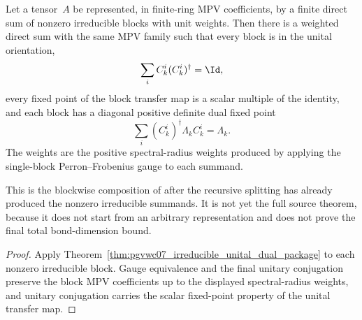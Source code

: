 \begin{theorem}%
    \label{thm:pgvwc07_blockwise_unital_dual_package}
    \leanok
    Let a tensor~$A$ be represented, in finite-ring MPV coefficients, by a
    finite direct sum of nonzero irreducible blocks with unit weights. Then
    there is a weighted direct sum with the same MPV family such that every
    block is in the unital orientation,
    \[
        \sum_i C_k^i(C_k^i)^\dagger=\Id ,
    \]
    every fixed point of the block transfer map is a scalar multiple of the
    identity, and each block has a diagonal positive definite dual fixed point
    \[
        \sum_i (C_k^i)^\dagger\Lambda_k C_k^i=\Lambda_k.
    \]
    The weights are the positive spectral-radius weights produced by applying
    the single-block Perron--Frobenius gauge to each summand.

    This is the blockwise composition of
    \cite[Theorem~Th:TIcanonical]{PerezGarcia2007Matrix} after the recursive
    splitting has already produced the nonzero irreducible summands. It is not
    yet the full source theorem, because it does not start from an arbitrary
    representation and does not prove the final total bond-dimension bound.
\end{theorem}
\begin{proof}\leanok
    Apply Theorem~\ref{thm:pgvwc07_irreducible_unital_dual_package} to each
    nonzero irreducible block. Gauge equivalence and the final unitary
    conjugation preserve the block MPV coefficients up to the displayed
    spectral-radius weights, and unitary conjugation carries the scalar
    fixed-point property of the unital transfer map.
\end{proof}

